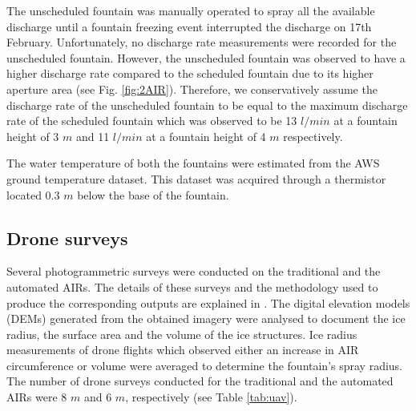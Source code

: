 \documentclass[tc, manuscript]{copernicus}
\begin{document}
The unscheduled fountain was manually operated to spray all the available discharge until a fountain freezing
event interrupted the discharge on 17th February. Unfortunately, no discharge rate measurements were recorded
for the unscheduled fountain. However, the unscheduled fountain was observed to have a higher discharge rate
compared to the scheduled fountain due to its higher aperture area (see Fig. \ref{fig:2AIR}). Therefore, we
conservatively assume the discharge rate of the unscheduled fountain to be equal to the maximum discharge rate
of the scheduled fountain which was observed to be 13 $l/min$ at a fountain height of 3 $m$ and 11 $l/min$ at a
fountain height of 4 $m$ respectively.

The water temperature of both the fountains were estimated from the AWS ground temperature dataset. This dataset
was acquired through a thermistor located 0.3 $m$ below the base of the fountain.

\subsection{Drone surveys}

Several photogrammetric surveys were conducted on the traditional and the automated AIRs. The details of these
surveys and the methodology used to produce the corresponding outputs are explained in
\cite{balasubramanianInfluenceMeteorologicalConditions2022}. The digital elevation models (DEMs) generated from
the obtained imagery were analysed to document the ice radius, the surface area and the volume of the ice
structures. Ice radius measurements of drone flights which observed either an increase in AIR circumference or
volume were averaged to determine the fountain's spray radius. The number of drone surveys conducted for the
traditional and the automated AIRs were 8 $m$ and 6 $m$, respectively (see Table \ref{tab:uav}). 
\end{document}
